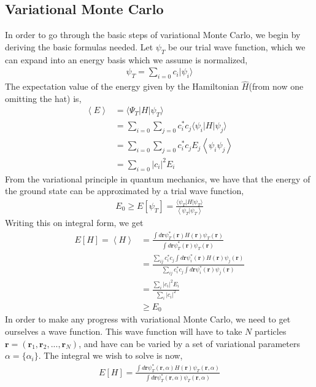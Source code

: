 \documentclass[11pt]{article}
\newcommand{\expect}[1]{\left\langle{#1}\right\rangle}
\newcommand{\bra}[1]{\langle{#1}|}
\newcommand{\ket}[1]{|{#1}\rangle}
\begin{document}
\subsection{Variational Monte Carlo}
In order to go through the basic steps of variational Monte Carlo, we begin by deriving the basic formulas needed. Let $\psi_T$ be our trial wave function, which we can expand into an energy basis which we assume is normalized,
\begin{align*}
	\psi_T = \sum_{i=0}c_i \ket{\psi_i}
\end{align*}
The expectation value of the energy given by the Hamiltonian $\hat{H}$(from now one omitting the hat) is,
\begin{align*}
	\expect{E} &= \bra{\Psi_T}H\ket{\psi_T}\\ 
	&= \sum_{i=0}\sum_{j=0}c_i^*c_j\bra{\psi_i}H\ket{\psi_j} \\
	&= \sum_{i=0}\sum_{j=0}c_i^*c_j E_j\expect{\psi_i\psi_j} \\
	&= \sum_{i=0}|c_i|^2 E_i
\end{align*}
From the variational principle in quantum mechanics, we have that the energy of the ground state can be approximated by a trial wave function,
\begin{align}
	E_0 \geq E[\psi_T] = \frac{\bra{\psi_T}H\ket{\psi_T}}{\expect{\psi_T|\psi_T}}
	\label{eq:variational-principle}
\end{align}
Writing this on integral form, we get
\begin{align*}
	E[H] = \expect{H} &= \frac{\int d\mathbf{r}\psi_T^*(\mathbf{r})H(\mathbf{r})\psi_T(\mathbf{r}) }{\int d\mathbf{r} \psi_T^*(\mathbf{r})\psi_T(\mathbf{r})} \\
	&=\frac{\sum_{ij} c_i^*c_j\int d\mathbf{r}\psi_i^*(\mathbf{r})H(\mathbf{r})\psi_j(\mathbf{r}) }{\sum_{ij}c_i^*c_j\int d\mathbf{r} \psi_i^*(\mathbf{r})\psi_j(\mathbf{r})} \\
	&= \frac{\sum_i |c_i|^2 E_i}{\sum_i |c_i|^2} \\
	&\geq E_0
\end{align*}
In order to make any progress with variational Monte Carlo, we need to get ourselves a wave function. This wave function will have to take $N$ particles $\mathbf{r}=(\mathbf{r}_1,\mathbf{r}_2,...,\mathbf{r}_N)$, and have can be varied by a set of variational parameters $\alpha=\{\alpha_i\}$. The integral we wish to solve is now,
\begin{align}
	E[H] = \frac{\int d\mathbf{r}\psi_T^*(\mathbf{r},\alpha)H(\mathbf{r})\psi_T(\mathbf{r},\alpha) }{\int d\mathbf{r} \psi_T^*(\mathbf{r},\alpha)\psi_T(\mathbf{r},\alpha)}
	\label{eq:variational-integral}
\end{align}
\end{document}
